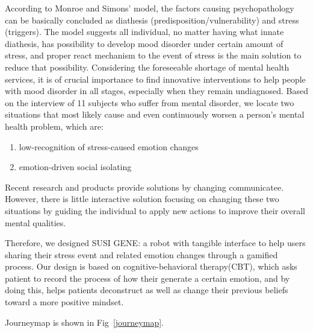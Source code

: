 \documentclass[manuscript,screen]{acmart}
\begin{document}
According to Monroe and Simons' model, the factors causing psychopathology can be basically concluded as diathesis (predisposition/vulnerability) and stress (triggers).\cite{monroe1991diathesis}
The model suggests all individual, no matter having what innate diathesis, has possibility to develop mood disorder under certain amount of stress, and proper react mechanism to the event of stress is the main solution to reduce that possibility. Considering the foreseeable shortage of mental health services, it is of crucial importance to find innovative interventions to help people with mood disorder in all stages, especially when they remain undiagnosed. Based on the interview of 11 subjects who suffer from mental disorder, we locate two situations that most likely cause and even continuously worsen a person’s mental health problem, which are:

\begin{enumerate}
  \item low-recognition of stress-caused emotion changes
  \item emotion-driven social isolating
\end{enumerate} 

Recent research and products provide solutions by changing communicatee. However, there is little interactive solution focusing on changing these two situations by guiding the individual to apply new actions to improve their overall mental qualities.

Therefore, we designed SUSI GENE: a robot with tangible interface to help users sharing their stress event and related emotion changes through a gamified process. Our design is based on cognitive-behavioral therapy(CBT), which asks patient to record the process of how their generate a certain emotion, and by doing this, helps patients deconstruct as well as change their previous beliefs toward a more positive mindset.

Journeymap is shown in Fig~\ref{journeymap}.
\end{document}
